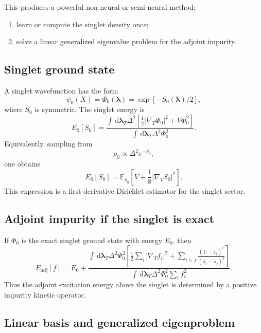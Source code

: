 \documentclass[11pt]{article}
\newcommand{\dd}{\,\mathrm d}
\newcommand{\E}{\mathbb E}
\newcommand{\gradT}{\nabla_{\!T}}
\begin{document}
This produces a powerful non-neural or semi-neural method:
\begin{enumerate}[label=(\roman*)]
\item learn or compute the singlet density once;
\item solve a linear generalized eigenvalue problem for the adjoint impurity.
\end{enumerate}

\subsection{Singlet ground state}

A singlet wavefunction has the form
\begin{equation}
\psi_0(X)=\Phi_0(\bm\lambda)=\exp[-S_0(\bm\lambda)/2],
\end{equation}
where $S_0$ is symmetric.  The singlet energy is
\begin{equation}
E_0[S_0]
=\frac{
\int\dd\bm\lambda_T\Delta^2
\left[\frac12|\gradT\Phi_0|^2+V\Phi_0^2\right]
}{
\int\dd\bm\lambda_T\Delta^2\Phi_0^2
}.
\end{equation}
Equivalently, sampling from
\begin{equation}
\rho_0\propto\Delta^2e^{-S_0},
\end{equation}
one obtains
\begin{equation}
E_0[S_0]=\E_{\rho_0}\left[V+\frac18|\gradT S_0|^2\right].
\end{equation}
This expression is a first-derivative Dirichlet estimator for the singlet sector.

\subsection{Adjoint impurity if the singlet is exact}

If $\Phi_0$ is the exact singlet ground state with energy $E_0$, then
\begin{equation}
\boxed{
E_{\mathrm{adj}}[f]
=E_0+
\frac{
\int\dd\bm\lambda_T\Delta^2\Phi_0^2
\left[\frac12\sum_i|\gradT f_i|^2
+\sum_{i<j}\frac{(f_i-f_j)^2}{(\lambda_i-\lambda_j)^2}
\right]
}{
\int\dd\bm\lambda_T\Delta^2\Phi_0^2\sum_if_i^2
}.
}
\label{eq:exact_singlet_impurity_energy}
\end{equation}
Thus the adjoint excitation energy above the singlet is determined by a positive impurity kinetic operator.

\subsection{Linear basis and generalized eigenproblem}
\end{document}
